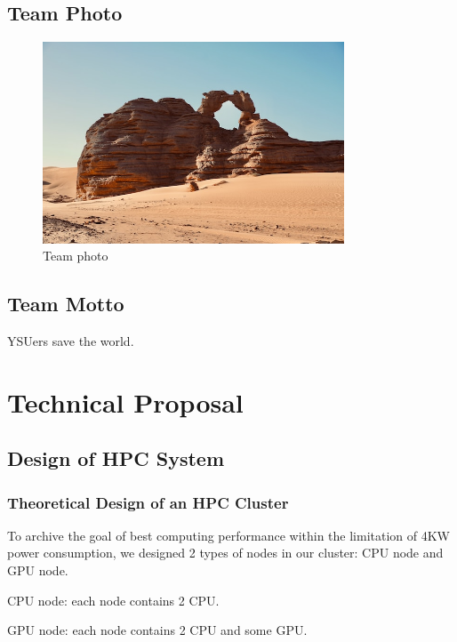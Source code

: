 \documentclass[a4paper,12pt]{article}
\begin{document}
\subsection{Team Photo}

\begin{figure}[H]
    \centering
    \includegraphics[width=0.8\textwidth]{Team_Photo.png}
    \caption{Team photo}
    \label{fig:team_photo}
\end{figure}


\subsection{Team Motto}

YSUers save the world.

\newpage

\section{Technical Proposal}

\subsection{Design of HPC System}

\subsubsection{Theoretical Design of an HPC Cluster}

To archive the goal of best computing performance within the limitation of 4KW power consumption, we designed 2 types of nodes in our cluster: CPU node and GPU node.

CPU node: each node contains 2 CPU.

GPU node: each node contains 2 CPU and some GPU.
\end{document}
